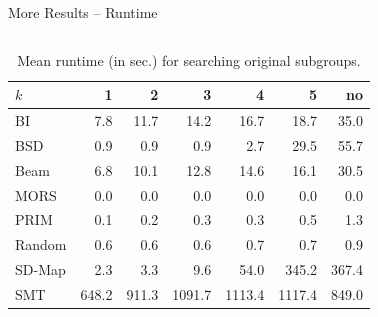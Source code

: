 \documentclass[en, navbaroff, handout]{sdqbeamer}
\begin{document}
\begin{frame}[t]{More Results -- Runtime}
	\begin{columns}[T]
		\begin{column}{\kitthreecolumns}
			\begin{table}
				\centering
				\caption*{
					Mean runtime (in sec.) for searching original subgroups.
				}
				\begin{tabular}{lrrrrrr}
					\toprule
					$k$ & 1 & 2 & 3 & 4 & 5 & no \\
					\midrule
					BI & 7.8 & 11.7 & 14.2 & 16.7 & 18.7 & 35.0 \\
					BSD & 0.9 & 0.9 & 0.9 & 2.7 & 29.5 & 55.7 \\
					Beam & 6.8 & 10.1 & 12.8 & 14.6 & 16.1 & 30.5 \\
					MORS & 0.0 & 0.0 & 0.0 & 0.0 & 0.0 & 0.0 \\
					PRIM & 0.1 & 0.2 & 0.3 & 0.3 & 0.5 & 1.3 \\
					Random & 0.6 & 0.6 & 0.6 & 0.7 & 0.7 & 0.9 \\
					SD-Map & 2.3 & 3.3 & 9.6 & 54.0 & 345.2 & 367.4 \\
					SMT & 648.2 & 911.3 & 1091.7 & 1113.4 & 1117.4 & 849.0 \\
					\bottomrule
				\end{tabular}
				\label{tab:csd:cardinality-runtime}
			\end{table}
		\end{column}
		\begin{column}{\kitthreecolumns}
			\begin{table}[t]
				\centering
				\caption*{
					Mean runtime (in sec.) for searching alternative subgroup descriptions.
}
\end{table}
\end{column}
\end{columns}
\end{frame}
\end{document}
